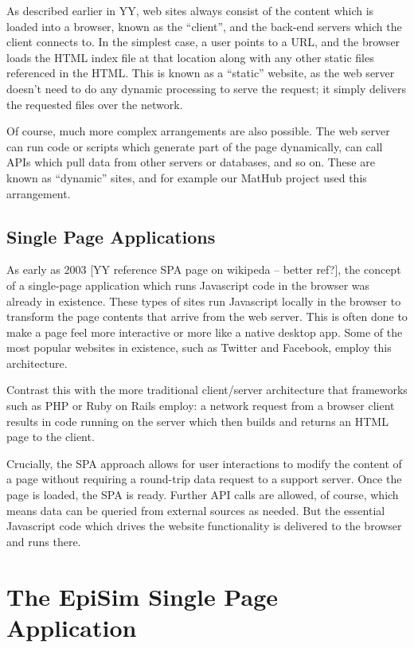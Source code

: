 As described earlier in YY, web sites always consist of the content
which is loaded into a browser, known as the ``client'', and the
back-end servers which the client connects to. In the simplest case, a
user points to a URL, and the browser loads the HTML index file at that
location along with any other static files referenced in the HTML. This
is known as a ``static'' website, as the web server doesn't need to do
any dynamic processing to serve the request; it simply delivers the
requested files over the network.

Of course, much more complex arrangements are also possible. The web
server can run code or scripts which generate part of the page
dynamically, can call APIs which pull data from other servers or
databases, and so on. These are known as ``dynamic'' sites, and for
example our MatHub project used this arrangement.

\hypertarget{single-page-applications}{%
\subsection{Single Page Applications}\label{single-page-applications}}

As early as 2003 {[}YY reference SPA page on wikipeda -- better ref?{]},
the concept of a single-page application which runs Javascript code in
the browser was already in existence. These types of sites run
Javascript locally in the browser to transform the page contents that
arrive from the web server. This is often done to make a page feel more
interactive or more like a native desktop app. Some of the most popular
websites in existence, such as Twitter and Facebook, employ this
architecture.

Contrast this with the more traditional client/server architecture that
frameworks such as PHP or Ruby on Rails employ: a network request from a
browser client results in code running on the server which then builds
and returns an HTML page to the client.

Crucially, the SPA approach allows for user interactions to modify the
content of a page without requiring a round-trip data request to a
support server. Once the page is loaded, the SPA is ready. Further API
calls are allowed, of course, which means data can be queried from
external sources as needed. But the essential Javascript code which
drives the website functionality is delivered to the browser and runs
there.

\hypertarget{the-episim-single-page-application}{%
\section{The EpiSim Single Page
Application}\label{the-episim-single-page-application}}

